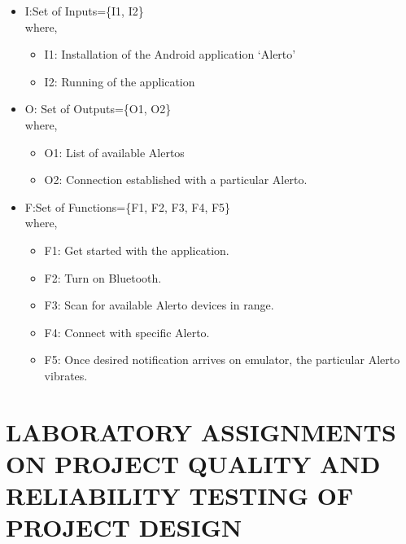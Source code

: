 \documentclass[12pt,a4paper]{report}
\begin{document}
\begin{appendices}
\begin{itemize}
\begin{itemize}
\item I:Set of Inputs=\{I1, I2\}\\
where,
\begin{itemize}
\item I1: Installation of the Android application ‘Alerto’
\item I2: Running of the application
\end{itemize}
\item O: Set of Outputs=\{O1, O2\}\\
where,
\begin{itemize}
\item O1: List of available Alertos
\item O2: Connection established with a particular Alerto.
\end{itemize}
\item F:Set of Functions=\{F1, F2, F3, F4, F5\}\\
where,
\begin{itemize}
\item F1: Get started with the application.
\item F2: Turn on Bluetooth.
\item F3: Scan for available Alerto devices in range.
\item F4: Connect with specific Alerto.
\item F5: Once desired notification arrives on emulator, the particular Alerto vibrates.
\end{itemize}
\end{itemize}
\end{itemize}

\chapter{LABORATORY ASSIGNMENTS ON PROJECT QUALITY AND RELIABILITY TESTING OF PROJECT DESIGN}
\newpage


\end{appendices}
\end{document}
